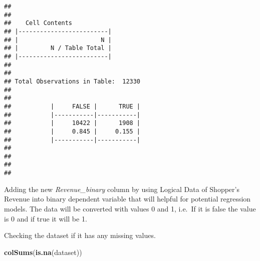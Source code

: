 \documentclass[
]{article}
\newenvironment{Shaded}{\begin{snugshade}}{\end{snugshade}}
\newcommand{\DataTypeTok}[1]{\textcolor[rgb]{0.13,0.29,0.53}{#1}}
\newcommand{\DecValTok}[1]{\textcolor[rgb]{0.00,0.00,0.81}{#1}}
\newcommand{\KeywordTok}[1]{\textcolor[rgb]{0.13,0.29,0.53}{\textbf{#1}}}
\newcommand{\NormalTok}[1]{#1}
\newcommand{\OperatorTok}[1]{\textcolor[rgb]{0.81,0.36,0.00}{\textbf{#1}}}
\newcommand{\StringTok}[1]{\textcolor[rgb]{0.31,0.60,0.02}{#1}}
\begin{document}
\begin{Shaded}
\end{Shaded}

\begin{verbatim}
## 
##  
##    Cell Contents
## |-------------------------|
## |                       N |
## |         N / Table Total |
## |-------------------------|
## 
##  
## Total Observations in Table:  12330 
## 
##  
##           |     FALSE |      TRUE | 
##           |-----------|-----------|
##           |     10422 |      1908 | 
##           |     0.845 |     0.155 | 
##           |-----------|-----------|
## 
## 
## 
## 
\end{verbatim}

Adding the new \emph{Revenue\_binary} column by using Logical Data of
Shopper's Revenue into binary dependent variable that will helpful for
potential regression models. The data will be converted with values 0
and 1, i.e.~If it is false the value is 0 and if true it will be 1.

\begin{Shaded}
\end{Shaded}

Checking the dataset if it has any missing values.

\begin{Shaded}
\begin{Highlighting}[]
\KeywordTok{colSums}\NormalTok{(}\KeywordTok{is.na}\NormalTok{(dataset))}
\end{Highlighting}
\end{Shaded}
\end{document}
